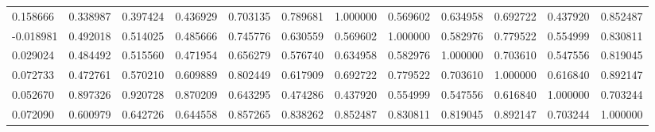 \begin{table}
\begin{tabular}{lcr}
0.158666 & 0.338987 & 0.397424 & 0.436929 & 0.703135 & 0.789681 & 1.000000 & 0.569602 & 0.634958 & 0.692722 & 0.437920 & 0.852487 \\
-0.018981 & 0.492018 & 0.514025 & 0.485666 & 0.745776 & 0.630559 & 0.569602 & 1.000000 & 0.582976 & 0.779522 & 0.554999 & 0.830811 \\
0.029024 & 0.484492 & 0.515560 & 0.471954 & 0.656279 & 0.576740 & 0.634958 & 0.582976 & 1.000000 & 0.703610 & 0.547556 & 0.819045 \\
0.072733 & 0.472761 & 0.570210 & 0.609889 & 0.802449 & 0.617909 & 0.692722 & 0.779522 & 0.703610 & 1.000000 & 0.616840 & 0.892147 \\
0.052670 & 0.897326 & 0.920728 & 0.870209 & 0.643295 & 0.474286 & 0.437920 & 0.554999 & 0.547556 & 0.616840 & 1.000000 & 0.703244 \\
0.072090 & 0.600979 & 0.642726 & 0.644558 & 0.857265 & 0.838262 & 0.852487 & 0.830811 & 0.819045 & 0.892147 & 0.703244 & 1.000000 \\
\bottomrule
\end{tabular}
\end{table}
